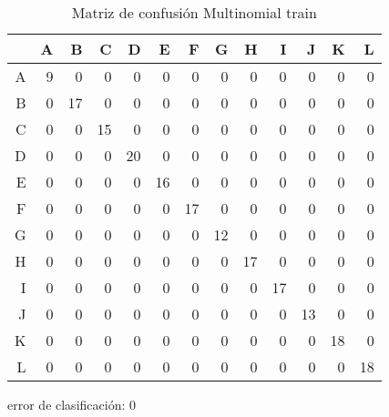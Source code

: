 \begin{table}[ht]
\centering
\begin{tabular}{rrrrrrrrrrrrr}
  \hline
 & A & B & C & D & E & F & G & H & I & J & K & L \\ 
  \hline
A &   9 &   0 &   0 &   0 &   0 &   0 &   0 &   0 &   0 &   0 &   0 &   0 \\ 
  B &   0 &  17 &   0 &   0 &   0 &   0 &   0 &   0 &   0 &   0 &   0 &   0 \\ 
  C &   0 &   0 &  15 &   0 &   0 &   0 &   0 &   0 &   0 &   0 &   0 &   0 \\ 
  D &   0 &   0 &   0 &  20 &   0 &   0 &   0 &   0 &   0 &   0 &   0 &   0 \\ 
  E &   0 &   0 &   0 &   0 &  16 &   0 &   0 &   0 &   0 &   0 &   0 &   0 \\ 
  F &   0 &   0 &   0 &   0 &   0 &  17 &   0 &   0 &   0 &   0 &   0 &   0 \\ 
  G &   0 &   0 &   0 &   0 &   0 &   0 &  12 &   0 &   0 &   0 &   0 &   0 \\ 
  H &   0 &   0 &   0 &   0 &   0 &   0 &   0 &  17 &   0 &   0 &   0 &   0 \\ 
  I &   0 &   0 &   0 &   0 &   0 &   0 &   0 &   0 &  17 &   0 &   0 &   0 \\ 
  J &   0 &   0 &   0 &   0 &   0 &   0 &   0 &   0 &   0 &  13 &   0 &   0 \\ 
  K &   0 &   0 &   0 &   0 &   0 &   0 &   0 &   0 &   0 &   0 &  18 &   0 \\ 
  L &   0 &   0 &   0 &   0 &   0 &   0 &   0 &   0 &   0 &   0 &   0 &  18 \\ 
   \hline
\end{tabular}
	\label{tabla:confusionMLtrain}
	\caption{Matriz de confusión Multinomial train}
\end{table}

error de clasificación: 0


